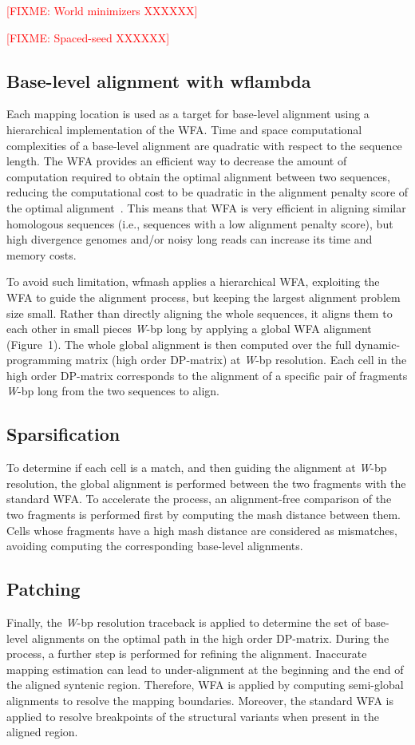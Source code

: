 \documentclass{bioinfo}
\theoremstyle{definition}
\newcommand{\red}[1]{{\textcolor{Red}{#1}}}
\newcommand{\FIXME}[1]{\red{[FIXME: #1]}}
\begin{document}
\FIXME{World minimizers XXXXXX}

\FIXME{Spaced-seed XXXXXX}


\subsection{Base-level alignment with wflambda}
Each mapping location is used as a target for base-level alignment using a hierarchical implementation of the WFA.
Time and space computational complexities of a base-level alignment are quadratic with respect to the sequence length.
The WFA provides an efficient way to decrease the amount of computation required to obtain the optimal alignment between two sequences, reducing the computational cost to be quadratic in the alignment penalty score of the optimal alignment~\citep{Marco_Sola_2020}.
This means that WFA is very efficient in aligning similar homologous sequences (i.e., sequences with a low alignment penalty score), but high divergence genomes and/or noisy long reads can increase its time and memory costs.

To avoid such limitation, wfmash applies a hierarchical WFA, exploiting the WFA to guide the alignment process, but keeping the largest alignment problem size small.
Rather than directly aligning the whole sequences, it aligns them to each other in small pieces \textit{W}-bp long by applying a global WFA alignment (Figure~1\vphantom{\ref{fig:1}}).
The whole global alignment is then computed over the full dynamic-programming matrix (high order DP-matrix) at \textit{W}-bp resolution.
Each cell in the high order DP-matrix corresponds to the alignment of a specific pair of fragments \textit{W}-bp long from the two sequences to align.

\subsection{Sparsification}
To determine if each cell is a match, and then guiding the alignment at \textit{W}-bp resolution, the global alignment is performed between the two fragments with the standard WFA.
To accelerate the process, an alignment-free comparison of the two fragments is performed first by computing the mash distance between them.
Cells whose fragments have a high mash distance are considered as mismatches, avoiding computing the corresponding base-level alignments.

\subsection{Patching}
Finally, the \textit{W}-bp resolution traceback is applied to determine the set of base-level alignments on the optimal path in the high order DP-matrix.
During the process, a further step is performed for refining the alignment.
Inaccurate mapping estimation can lead to under-alignment at the beginning and the end of the aligned syntenic region.
Therefore, WFA is applied by computing semi-global alignments to resolve the mapping boundaries.
Moreover, the standard WFA is applied to resolve breakpoints of the structural variants when present in the aligned region.
\end{document}
